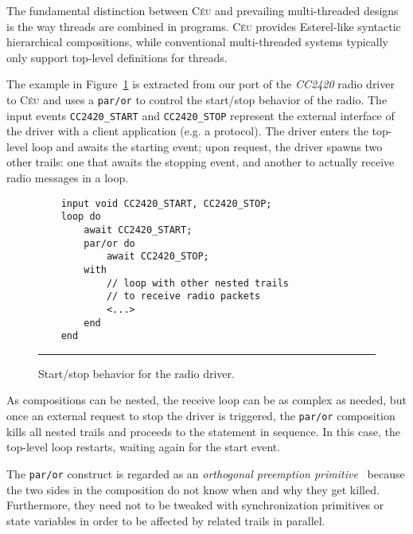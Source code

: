 \documentclass[10pt]{sensys-proc}
\newcommand{\CEU}{\textsc{C\'{e}u}\xspace}
\newcommand{\code}[1] {{\small{\texttt{#1}}}}
\begin{document}
The fundamental distinction between \CEU and prevailing multi-threaded designs 
is the way threads are combined in programs.
\CEU provides Esterel-like syntactic hierarchical compositions, while 
conventional multi-threaded systems typically only support top-level 
definitions for threads.

The example in Figure~\ref{lst.radio} is extracted from our port of the 
\emph{CC2420} radio driver~\cite{wsn.teps} to \CEU and uses a \code{par/or} to 
control the start/stop behavior of the radio.
The input events \code{CC2420\_START} and \code{CC2420\_STOP} represent the 
external interface of the driver with a client application (e.g. a protocol).
The driver enters the top-level loop and awaits the starting event;
upon request, the driver spawns two other trails:
one that awaits the stopping event,
and another to actually receive radio messages in a loop.

\begin{figure}[t]
{\small
\begin{verbatim}
    input void CC2420_START, CC2420_STOP;
    loop do
        await CC2420_START;
        par/or do
            await CC2420_STOP;
        with
            // loop with other nested trails
            // to receive radio packets
            <...>
        end
    end
\end{verbatim}
}%
\rule{8.5cm}{0.37pt}
\caption{ Start/stop behavior for the radio driver.
\label{lst.radio}
}
\end{figure}

As compositions can be nested, the receive loop can be as complex as needed, 
but once an external request to stop the driver is triggered, the \code{par/or} 
composition kills all nested trails and proceeds to the statement in sequence.
In this case, the top-level loop restarts, waiting again for the start event.

The \code{par/or} construct is regarded as an \emph{orthogonal preemption 
primitive}~\cite{esterel.preemption} because the two sides in the composition 
do not know when and why they get killed.
Furthermore, they need not to be tweaked with synchronization primitives or 
state variables in order to be affected by related trails in parallel.

\begin{comment}
The same start/stop control pattern for the radio driver appears in all ported 
network protocols presented in Section~\ref{sec.eval}.
In practical terms, parallel compositions eliminated all state variables in our 
ports, not only those related to split-phase 
operations~\cite{wsn.protothreads}.
\end{comment}
\end{document}
